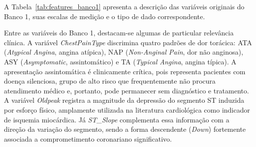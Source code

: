 A Tabela~\ref{tab:features_banco1} apresenta a descrição das variáveis originais do Banco 1, suas escalas de medição e o tipo de dado correspondente.

\begin{table}[H]
\centering
\caption{Variáveis originais do Banco 1 (UCI Heart Disease Dataset).}
\label{tab:features_banco1}
\end{table}

Entre as variáveis do Banco 1, destacam-se algumas de particular relevância clínica. A variável \textit{ChestPainType} discrimina quatro padrões de dor torácica: ATA (\textit{Atypical Angina}, angina atípica), NAP (\textit{Non-Anginal Pain}, dor não anginosa), ASY (\textit{Asymptomatic}, assintomático) e TA (\textit{Typical Angina}, angina típica). A apresentação assintomática é clinicamente crítica, pois representa pacientes com doença silenciosa, grupo de alto risco que frequentemente não procura atendimento médico e, portanto, pode permanecer sem diagnóstico e tratamento. A variável \textit{Oldpeak} registra a magnitude da depressão do segmento ST induzida por esforço físico, amplamente utilizada na literatura cardiológica como indicador de isquemia miocárdica. Já \textit{ST\_Slope} complementa essa informação com a direção da variação do segmento, sendo a forma descendente (\textit{Down}) fortemente associada a comprometimento coronariano significativo.

